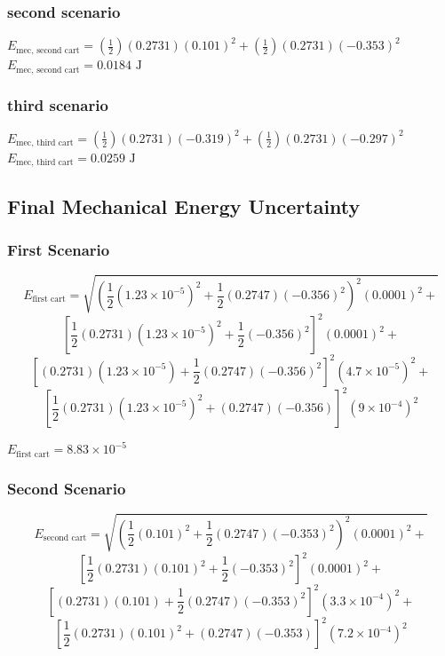 \documentclass{article}
\begin{document}
\subsubsection{second scenario}
$E_{\text {mec, second cart}} = (\frac {1}{2})(0.2731)(0.101)^2+(\frac {1}{2})(0.2731)(-0.353)^2$
\newline
$E_{\text {mec, second cart}} = 0.0184 \text { J}$
\subsubsection{third scenario}
$E_{\text {mec, third cart}} = (\frac {1}{2})(0.2731)(-0.319)^2+(\frac {1}{2})(0.2731)(-0.297)^2$
\newline
$E_{\text {mec, third cart}} = 0.0259 \text { J}$
\subsection{Final Mechanical Energy Uncertainty}
\subsubsection{First Scenario}

\[
E_{\text{first cart}} = \sqrt{
    \left( \frac{1}{2} \left( 1.23 \times 10^{-5} \right)^2 + \frac{1}{2} \left( 0.2747 \right) \left( -0.356 \right)^2 \right)^2 \left( 0.0001 \right)^2 +
}
\]
\[
\left[
    \frac{1}{2} \left( 0.2731 \right) \left( 1.23 \times 10^{-5} \right)^2 + \frac{1}{2} \left( -0.356 \right)^2
\right]^2 \left( 0.0001 \right)^2 +
\]
\[
\left[
    \left( 0.2731 \right) \left( 1.23 \times 10^{-5} \right) + \frac{1}{2} \left( 0.2747 \right) \left( -0.356 \right)^2
\right]^2 \left( 4.7 \times 10^{-5} \right)^2 +
\]
\[
\left[
    \frac{1}{2} \left( 0.2731 \right) \left( 1.23 \times 10^{-5} \right)^2 + \left( 0.2747 \right) \left( -0.356 \right)
\right]^2 \left( 9 \times 10^{-4} \right)^2
\]

$E_{\text{first cart}} = 8.83 \times 10^{-5}$

\subsubsection{Second Scenario}

\[
E_{\text{second cart}} = \sqrt{
    \left( \frac{1}{2} \left( 0.101 \right)^2 + \frac{1}{2} \left( 0.2747 \right) \left( -0.353 \right)^2 \right)^2 \left( 0.0001 \right)^2 +
}
\]
\[
\left[
    \frac{1}{2} \left( 0.2731 \right) \left( 0.101 \right)^2 + \frac{1}{2} \left( -0.353 \right)^2
\right]^2 \left( 0.0001 \right)^2 +
\]
\[
\left[
    \left( 0.2731 \right) \left( 0.101 \right) + \frac{1}{2} \left( 0.2747 \right) \left( -0.353 \right)^2
\right]^2 \left( 3.3 \times 10^{-4} \right)^2 +
\]
\[
\left[
    \frac{1}{2} \left( 0.2731 \right) \left( 0.101 \right)^2 + \left( 0.2747 \right) \left( -0.353 \right)
\right]^2 \left( 7.2 \times 10^{-4} \right)^2
\]
\end{document}

